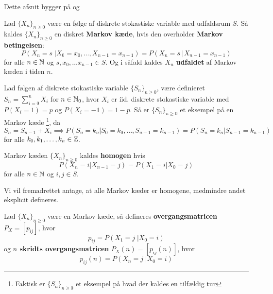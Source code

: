 Dette afsnit bygger på \cite{sandsynlighedsBog} og \cite{grimsandsynlighedsBog}
\begin{defn}
Lad $\{X_n\}_{n  \geq 0}$ være en følge af diskrete stokastiske variable med udfaldsrum $S$. Så kaldes $\{X_n\}_{n \geq 0}$ en diskret \textbf{Markov kæde}, hvis den overholder \textbf{Markov betingelsen}:
\begin{equation*}
    P(X_n = s \;| X_0 = x_0, \ldots, X_{n - 1} = x_{n - 1}) = P(X_n = s \;| X_{n - 1} = x_{n - 1})
\end{equation*}
for alle $n \in \mathbb{N}$ og $s, x_0, \ldots x_{n - 1} \in S$. Og i såfald kaldes $X_n$ \textbf{udfaldet} af Markov kæden i tiden $n$.
\end{defn}
\begin{exmp} Lad følgen af diskrete stokastiske variable $\{S_{n}\}_{n \geq 0}$, være definieret $S_{n} = \sum_{i=0}^n X_{i}$ for $n \in \mathbb{N}_{0}$, hvor $X_{i}$ er iid. diskrete stokastiske variable med $P(X_{i} = 1) = p$ og $P(X_{i} = -1) = 1 - p$. Så er $\{S_{n}\}_{n \geq 0}$ et eksempel på en Markov kæde \footnote{Faktisk er $\{S_{n}\}_{n \geq 0}$ et eksempel på hvad der kaldes en tilfældig tur}, da
  \begin{equation*}
    S_{n} = S_{n - 1} + X_{i} \implies P(S_{n} = k_{n} | S_{0} = k_{0}, \ldots, S_{n - 1} = k_{n - 1}) = P(S_{n} = k_{n} | S_{n - 1} = k_{n - 1})
  \end{equation*}
  for alle $k_{0}, k_{1}, \ldots, k_{n} \in \mathbb{Z}$.
\end{exmp}
\begin{defn}
Markov kæden $\{X_n\}_{n \geq 0}$ kaldes \textbf{homogen} hvis
\begin{equation*}
    P(X_n = i | X_{n - 1} = j) = P(X_1 = i | X_0 = j)
\end{equation*}
for alle $n \in \mathbb{N}$ og $i, j \in S$.
\end{defn}
Vi vil fremadrettet antage, at alle Markov kæder er homogene, medmindre andet eksplicit defineres.
\begin{defn}
Lad $\{X_n\}_{n \geq 0}$ være en Markov kæde, så defineres \textbf{overgangsmatricen} $P_X = [p_{ij}]$, hvor 
\begin{equation*}
    p_{ij} = P(X_1 = j \;| X_0 = i)
\end{equation*}
og \textbf{$n$ skridts overgangsmatricen} $P_X(n) = [p_{ij}(n)]$, hvor
\begin{equation*}
    p_{ij}(n) = P(X_n = j \;| X_0 = i)
\end{equation*}
\end{defn}

